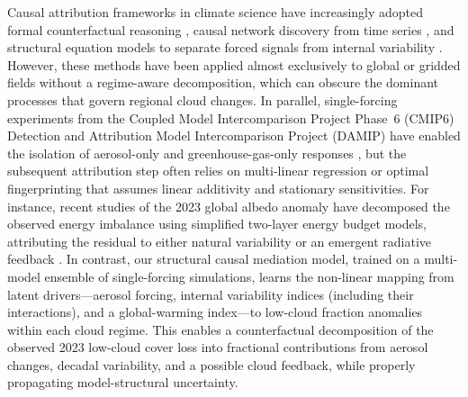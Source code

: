 \documentclass{article}
\begin{document}
Causal attribution frameworks in climate science have increasingly adopted formal counterfactual reasoning \cite{hannart2016causal}, causal network discovery from time series \cite{runge2019causal}, and structural equation models to separate forced signals from internal variability \cite{nowack2020causal}. However, these methods have been applied almost exclusively to global or gridded fields without a regime-aware decomposition, which can obscure the dominant processes that govern regional cloud changes. In parallel, single-forcing experiments from the Coupled Model Intercomparison Project Phase~6 (CMIP6) Detection and Attribution Model Intercomparison Project (DAMIP) have enabled the isolation of aerosol-only and greenhouse-gas-only responses \cite{gillett2019attribution}, but the subsequent attribution step often relies on multi-linear regression or optimal fingerprinting that assumes linear additivity and stationary sensitivities. For instance, recent studies of the 2023 global albedo anomaly have decomposed the observed energy imbalance using simplified two-layer energy budget models, attributing the residual to either natural variability or an emergent radiative feedback \cite{goessling2024unexplained,schmidt2024planetary}. In contrast, our structural causal mediation model, trained on a multi-model ensemble of single-forcing simulations, learns the non-linear mapping from latent drivers—aerosol forcing, internal variability indices (including their interactions), and a global-warming index—to low-cloud fraction anomalies within each cloud regime. This enables a counterfactual decomposition of the observed 2023 low-cloud cover loss into fractional contributions from aerosol changes, decadal variability, and a possible cloud feedback, while properly propagating model-structural uncertainty.
\end{document}
